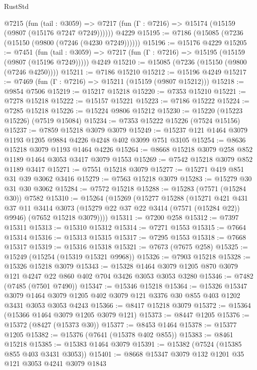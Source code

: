 \begin{lexlean}{RustStd}
\begin{coremodule}
{\begin{coremodule}
{{{{{{{{{{{{{{{{{{{{{{{{{{{{{{{{    @7215
      (fun (tail : @3059) =>
      @7217 (fun (Γ : @7216) => @15174 (@15159 (@9807 (@15176 @7247 @7249))))))
    @4229
@15195 := @7186 (@15085 (@7236 (@15150 (@9800 (@7246 (@4230 @7249))))))
@15196 := @15176 @4229
@15205 := @7451
    (fun (tail : @3059) => @7217 (fun (Γ : @7216) => @15195 (@15159 (@9807 (@15196 @7249)))))
    @4249
@15210 := @15085 (@7236 (@15150 (@9800 (@7246 @4250))))
@15211 := @7186 @15210
@15212 := @15196 @4249
@15217 := @7469 (fun (Γ : @7216) => @15211 (@15159 (@9807 @15212)))
@15218 := @9854 @7506
@15219 := @15217 @15218
@15220 := @7353 @15210
@15221 := @7278 @15218
@15222 := @15157 @15221
@15223 := @7186 @15222
@15224 := @7285 @15218
@15226 := @15224 @9806 @15212
@15230 := @15220 (@15223 @15226) (@7519 @15084)
@15234 := @7353 @15222 @15226 (@7524 @15156)
@15237 := @7859 @15218 @3079 @3079
@15249 := @15237 @121 @1464 @3079 @1193 @1205 @9884 @4226 @4248 @402 @3099 @751 @3105
@15254 := @8636 @15218 @3079 @1193 @1464 @4226
@15264 := @8668 @15218 @3079 @258 @852 @1189 @1464 @3053 @3417 @3079 @1553
@15269 := @7542 @15218 @3079 @852 @1189 @3417
@15271 := @7551 @15218 @3079
@15277 := @15271 @419 @851 @31 @39 @3062 @3416
@15279 := @7563 @15218 @3079
@15283 := @15279 @30 @31 @30 @3062
@15284 := @7572 @15218
@15288 := @15283 (@7571 (@15284 @30)) @7582
@15310 := @15264
    (@15269
      (@15277
        @15288
        (@15271
          @421
          @431
          @37
          @11
          @3414
          @3073
          (@15279 @22 @37 @22 @3414 (@7571 (@15284 @22)) @9946)
          (@7652 @15218 @3079))))
@15311 := @7200 @258
@15312 := @7397 @15311
@15313 := @15310 @15312
@15314 := @7271 @1553
@15315 := @7664 @15314
@15316 := @15313 @15315
@15317 := @7295 @1553
@15318 := @7668 @15317
@15319 := @15316 @15318
@15321 := @7673 (@7675 @258)
@15325 := @15249 (@15254 (@15319 @15321 @9968))
@15326 := @7903 @15218
@15328 := @15326 @15218 @3079
@15343 := @15328 @1464 @3079 @1205 @870 @3079 @121 @4247 @22 @860 @402 @704 @3426 @3053 @3053 @3280
@15346 := @7482 (@7485 (@7501 @7490))
@15347 := @15346 @15218
@15364 := @15326
    @15347
    @3079
    @1464
    @3079
    @1205
    @402
    @3079
    @121
    @3376
    @30
    @855
    @403
    @1202
    @3431
    @3053
    @3053
    @4243
@15366 := @8417 @15218 @3079
@15372 := @15364 (@15366 @1464 @3079 @1205 @3079 @121)
@15373 := @8447 @1205
@15376 := @15372 (@8427 (@15373 @30))
@15377 := @8453 @1464
@15378 := @15377 @1205
@15382 := @15376 (@7641 (@15378 @402 @855))
@15383 := @8461 @15218
@15385 := @15383 @1464 @3079
@15391 := @15382 (@7524 (@15385 @855 @403 @3431 @3053))
@15401 := @8668 @15347 @3079 @132 @1201 @35 @121 @3053 @4241 @3079 @1843
}}}}}}}}}}}}}}}}}}}}}}}}}}}}}}}}
\end{coremodule}}
\end{coremodule}
\end{lexlean}
